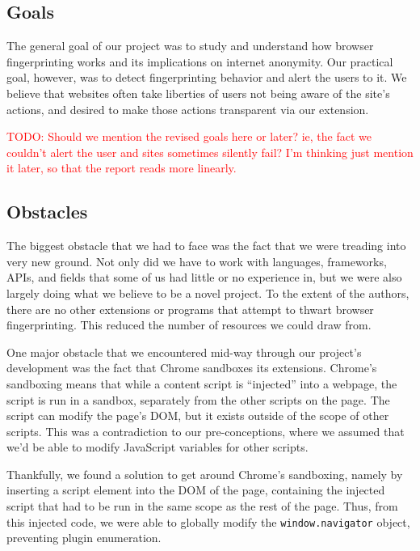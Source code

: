 \documentclass[12pt,a4paper]{article}
\begin{document}
\subsection{Goals}
The general goal of our project was to study and understand how browser fingerprinting works and its implications on internet anonymity. Our practical goal, however, was to detect fingerprinting behavior and alert the users to it. We believe that websites often take liberties of users not being aware of the site's actions, and desired to make those actions transparent via our extension.

\textcolor{red}{TODO: Should we mention the revised goals here or later? ie, the fact we couldn't alert the user and sites sometimes silently fail? I'm thinking just mention it later, so that the report reads more linearly.}

\subsection{Obstacles}
The biggest obstacle that we had to face was the fact that we were treading into very new ground. Not only did we have to work with languages, frameworks, APIs, and fields that some of us had little or no experience in, but we were also largely doing what we believe to be a novel project. To the extent of the authors, there are no other extensions or programs that attempt to thwart browser fingerprinting. This reduced the number of resources we could draw from.

One major obstacle that we encountered mid-way through our project's development was the fact that Chrome sandboxes its extensions. Chrome's sandboxing means that while a content script is ``injected'' into a webpage, the script is run in a sandbox, separately from the other scripts on the page. The script can modify the page's DOM, but it exists outside of the scope of other scripts. This was a contradiction to our pre-conceptions, where we assumed that we'd be able to modify JavaScript variables for other scripts.

Thankfully, we found a solution to get around Chrome's sandboxing, namely by inserting a script element into the DOM of the page, containing the injected script that had to be run in the same scope as the rest of the page. Thus, from this injected code, we were able to globally modify the \texttt{window.navigator} object, preventing plugin enumeration.
\end{document}
